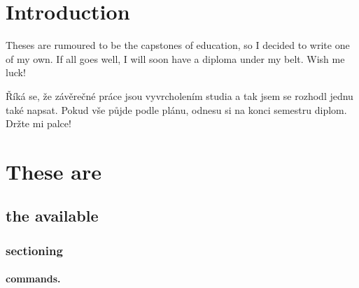 \documentclass[
  digital, %
  table,   %
  lof,     %
  lot,     %
]{fithesis3}
\begin{document}
\chapter*{Introduction}

Theses are rumoured to be the capstones of education, so I decided
to write one of my own. If all goes well, I will soon have a
diploma under my belt. Wish me luck!

\begin{otherlanguage}{czech}
Říká se, že závěrečné práce jsou vyvrcholením studia a tak jsem se
rozhodl jednu také napsat. Pokud vše půjde podle plánu, odnesu si
na konci semestru diplom. Držte mi palce!
\end{otherlanguage}

\chapter{These are}
\section{the available}
\subsection{sectioning}
\subsubsection{commands.}
\end{document}
